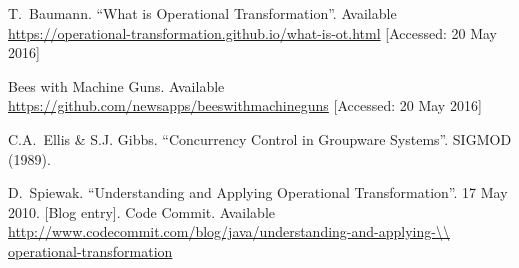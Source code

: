 \documentclass[letterpaper,11pt,twocolumn]{article}
\begin{document}
\begin{thebibliography}{EG} %

 T.\ Baumann. ``What is Operational Transformation''. Available \url{https://operational-transformation.github.io/what-is-ot.html} [Accessed: 20 May 2016]

 Bees with Machine Guns. Available \url{https://github.com/newsapps/beeswithmachineguns} [Accessed: 20 May 2016]

 C.A.\ Ellis \& S.J. Gibbs. ``Concurrency Control in Groupware Systems''. SIGMOD (1989).

  D.\ Spiewak. ``Understanding and Applying Operational Transformation''. 17 May 2010. [Blog entry]. Code Commit. Available \url{http://www.codecommit.com/blog/java/understanding-and-applying-\\ operational-transformation}



\end{thebibliography}
\end{document}
